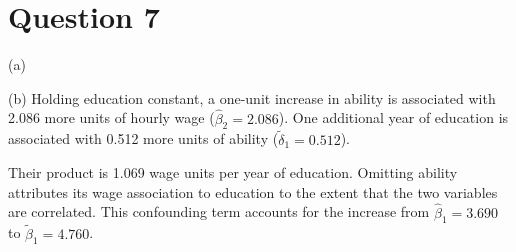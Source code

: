 \section*{Question 7}
\noindent (a)


\noindent (b) Holding education constant, a one-unit increase in ability
is associated with 2.086 more units of hourly wage ($\hat{\beta}_2=2.086$).
One additional year of education is associated with 0.512 more units of
ability ($\tilde{\delta}_1=0.512$).

Their product is 1.069 wage units per year of
education. Omitting ability attributes its wage association to education
to the extent that the two variables are correlated. This confounding
term accounts for the increase from $\hat{\beta}_1=3.690$ to
$\tilde{\beta}_1=4.760$.
